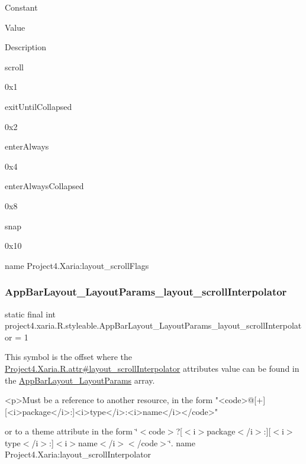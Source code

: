 Constant

Value

Description 

{\ttfamily scroll}

0x1

{\ttfamily exit\+Until\+Collapsed}

0x2

{\ttfamily enter\+Always}

0x4

{\ttfamily enter\+Always\+Collapsed}

0x8

{\ttfamily snap}

0x10

name Project4.\+Xaria\+:layout\+\_\+scroll\+Flags \mbox{\label{classproject4_1_1xaria_1_1R_1_1styleable_a73bbf7a84cde8c331a2578189008a585}} 
\subsubsection{\texorpdfstring{App\+Bar\+Layout\+\_\+\+Layout\+Params\+\_\+layout\+\_\+scroll\+Interpolator}{AppBarLayout\_LayoutParams\_layout\_scrollInterpolator}}
{\footnotesize\ttfamily static final int project4.\+xaria.\+R.\+styleable.\+App\+Bar\+Layout\+\_\+\+Layout\+Params\+\_\+layout\+\_\+scroll\+Interpolator = 1\hspace{0.3cm}{\ttfamily [static]}}

This symbol is the offset where the \hyperlink{}{Project4.\+Xaria.\+R.\+attr\#layout\+\_\+scroll\+Interpolator} attribute\textquotesingle{}s value can be found in the \hyperlink{classproject4_1_1xaria_1_1R_1_1styleable_ad61d02ae9d1a09e70900bcff9afa224d}{App\+Bar\+Layout\+\_\+\+Layout\+Params} array.

\begin{DoxyVerb}      <p>Must be a reference to another resource, in the form "<code>@[+][<i>package</i>:]<i>type</i>:<i>name</i></code>"
\end{DoxyVerb}
 or to a theme attribute in the form \char`\"{}$<$code$>$?\mbox{[}$<$i$>$package$<$/i$>$\+:\mbox{]}\mbox{[}$<$i$>$type$<$/i$>$\+:\mbox{]}$<$i$>$name$<$/i$>$$<$/code$>$\char`\"{}.  name Project4.\+Xaria\+:layout\+\_\+scroll\+Interpolator \mbox{\label{classproject4_1_1xaria_1_1R_1_1styleable_a54846c2740bf432b91663abbcab31165}} 
